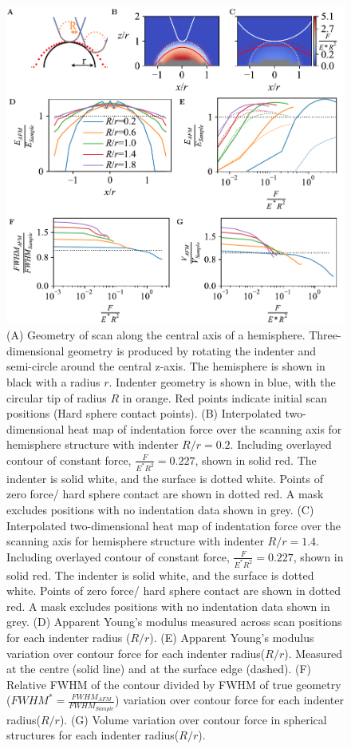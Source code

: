 \begin{figure}[htp]
    \centering
    \includegraphics[width=\linewidth]{Figures/Figure3.pdf} 
    \caption{\label{fig: Hemisphere Compression Plot}(A) Geometry of scan along the central axis of a hemisphere. Three-dimensional geometry is produced by rotating the indenter and semi-circle around the central z-axis. The hemisphere is shown in black with a radius $r$. Indenter geometry is shown in blue, with the circular tip of radius $R$ in orange. Red points indicate initial scan positions (Hard sphere contact points). (B) Interpolated two-dimensional heat map of indentation force over the scanning axis for hemisphere structure with indenter $R/r=0.2$. Including overlayed contour of constant force, $\frac{F}{E^*R^2} = 0.227 $, shown in solid red. The indenter is solid white, and the surface is dotted white. Points of zero force/ hard sphere contact are shown in dotted red. A mask excludes positions with no indentation data shown in grey. (C) Interpolated two-dimensional heat map of indentation force over the scanning axis for hemisphere structure with indenter $R/r=1.4$. Including overlayed contour of constant force, $\frac{F}{E^*R^2} = 0.227 $, shown in solid red. The indenter is solid white, and the surface is dotted white. Points of zero force/ hard sphere contact are shown in dotted red. A mask excludes positions with no indentation data shown in grey. (D) Apparent Young's modulus measured across scan positions for each indenter radius ($R/r$). (E) Apparent Young's modulus variation over contour force for each indenter radius($R/r$). Measured at the centre (solid line) and at the surface edge (dashed). (F) Relative FWHM of the contour divided by FWHM of true geometry ($FWHM^*=\frac{FWHM_{AFM}}{FWHM_{Sample}}$) variation over contour force for each indenter radius($R/r$). (G)  Volume variation over contour force in spherical structures for each indenter radius($R/r$).}
\end{figure}

